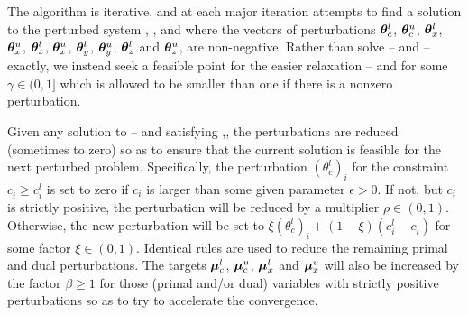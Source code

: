 \documentclass{galahad}
\begin{document}
\galmethod

The algorithm is iterative, and at each major iteration attempts
to find a solution to the perturbed system
, ,
and
where the vectors of perturbations 
$\bm \theta^l_c$,
$\bm \theta^u_c$,
$\bm \theta^l_x$,
$\bm \theta^u_x$,
$\bm \theta^l_x$,
$\bm \theta^u_x$,
$\bm \theta^l_y$,
$\bm \theta^u_y$,
$\bm \theta^l_z$ and
$\bm \theta^u_z$,
are non-negative. Rather than solve 
-- and --
exactly, we instead seek a feasible point for the easier relaxation
-- and
for some $\gamma \in (0,1]$ which is allowed to be smaller than one 
if there is a nonzero perturbation.

Given any solution to -- and 
satisfying ,,
the perturbations are reduced (sometimes to zero) so as to ensure that the 
current solution is feasible for the next perturbed problem. Specifically,
the perturbation $(\theta^l_c)_i^{}$ for the constraint $c_i^{} \geq c^l_i$
is set to zero if $c_i$ is larger than some given parameter $\epsilon > 0$.
If not, but $c_i$ is strictly positive, the perturbation will be
reduced by a multiplier $\rho \in (0,1)$. Otherwise, the new perturbation 
will be set to $\xi (\theta^l_c)_i^{} + ( 1 - \xi ) ( c_i^l - c_i^{} )$
for some factor $\xi \in (0,1)$. Identical rules are used to reduce the
remaining primal and dual perturbations. 
The targets $\bm \mu_c^{l}$, $\bm \mu_c^{u}$, $\bm \mu_x^{l}$ and $\bm \mu_x^{u}$
will also be increased by the factor $\beta \geq 1$ for those
(primal and/or dual) variables with strictly 
positive perturbations so as to try to accelerate the convergence. 
\end{document}
